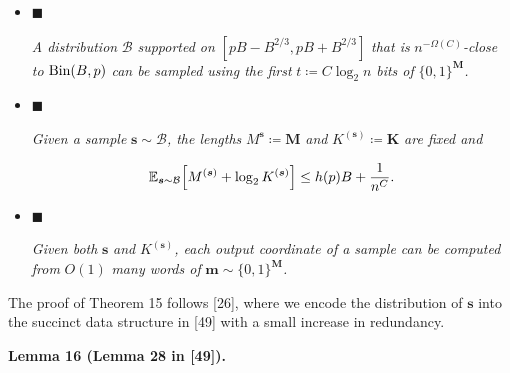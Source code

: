 \documentclass[10pt,a4paper]{article}
\begin{document}
\begin{itemize}


\item[] 
$\blacksquare$ 


\emph{A distribution }$\mathcal{B}$\emph{ supported on }$[pB-B^{2/3},pB+B^{2/3}]$\emph{ that is }$n^{-\Omega(C)}$\emph{-close to }$\textnormal{Bin}(B,p)$\emph{ can be sampled using the first }$t\coloneq C\log_{2}n$\emph{ bits of }$\{0,1\}^{\boldsymbol{M}}$\emph{.}\par





\item[] 
$\blacksquare$ 


\emph{Given a sample }$\boldsymbol{s}\sim\mathcal{B}$\emph{, the lengths }$M^{\boldsymbol{s}}\coloneq\boldsymbol{M}$\emph{ and }$K^{(\boldsymbol{s})}\coloneq\boldsymbol{K}$\emph{ are fixed and}\par


\[\begin{gathered}
\operatorname{\mathbb{E}}_{\boldsymbol{s}\sim\mathcal{B}}\Bigl[M^{(\boldsymbol{s})}+\log_{2}K^{(\boldsymbol{s})}\Bigr]\leq h(p)B+\frac{1}{n^{C}}.
\end{gathered}\]





\item[] 
$\blacksquare$ 


\emph{Given both }$\boldsymbol{s}$\emph{ and }$K^{(\boldsymbol{s})}$\emph{, each output coordinate of a sample can be computed from }$O(1)$\emph{ many words of }$\boldsymbol{m}\sim\{0,1\}^{\boldsymbol{M}}$\emph{.}\par





\end{itemize}






The proof of Theorem 15 follows [26], where we encode the distribution of $\boldsymbol{s}$ into the succinct data structure in [49] with a small increase in redundancy.\par





\par\medskip\noindent\textbf{
\textbf{Lemma 16}\textbf{ }(Lemma 28 in [49])\textbf{.}
}\par
\end{document}
